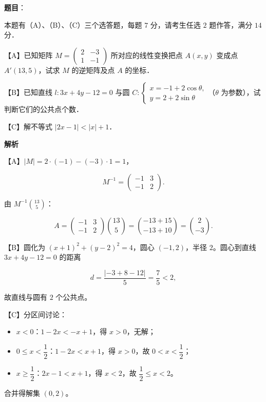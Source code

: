 \begin{answer}

\textbf{题目}：

本题有（A）、（B）、（C）三个选答题，每题 $7$ 分，请考生任选 $2$ 题作答，满分 $14$ 分．

【A】已知矩阵 $M=\begin{pmatrix}2&-3\\1&-1\end{pmatrix}$ 所对应的线性变换把点 $A(x,y)$ 变成点 $A'(13,5)$，试求 $M$ 的逆矩阵及点 $A$ 的坐标．

【B】已知直线 $l:3x+4y-12=0$ 与圆 $C:\begin{cases}x=-1+2\cos\theta,\\ y=2+2\sin\theta\end{cases}$（$\theta$ 为参数），试判断它们的公共点个数．

【C】解不等式 $|2x-1|<|x|+1$．

\textbf{解析}

【A】$|M|=2\cdot(-1)-(-3)\cdot1=1$，

\nopagebreak[4]
\[M^{-1}=\begin{pmatrix}-1&3\\-1&2\end{pmatrix}.\]

由 $M^{-1}\binom{13}5$：

\nopagebreak[4]
\[A=\begin{pmatrix}-1&3\\-1&2\end{pmatrix}\binom{13}5
=\binom{-13+15}{-13+10}=\binom2{-3}.\]

【B】圆化为 $(x+1)^2+(y-2)^2=4$，圆心 $(-1,2)$，半径 $2$。圆心到直线 $3x+4y-12=0$ 的距离

\nopagebreak[4]
\[d=\frac{|-3+8-12|}5=\frac75<2,\]

故直线与圆有 $2$ 个公共点。

【C】分区间讨论：

\begin{itemize}
\item $x<0$：$1-2x<-x+1$，得 $x>0$，无解；
\item $0\leqslant x<\dfrac12$：$1-2x<x+1$，得 $x>0$，故 $0<x<\dfrac12$；
\item $x\geqslant\dfrac12$：$2x-1<x+1$，得 $x<2$，故 $\dfrac12\leqslant x<2$。
\end{itemize}

合并得解集 $(0,2)$。


\end{answer}